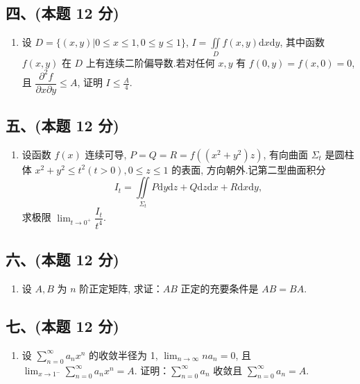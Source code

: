 \subsection*{四、(本题 12 分)}
\begin{enumerate}[start=7]
    \item 设 $D = \{(x,y) | 0 \leqslant x \leqslant 1, 0 \leqslant y \leqslant 1\}$, $I = \displaystyle\iint\limits_D f(x,y) \mathrm{d}x \mathrm{d}y$, 其中函数 $f(x,y)$ 在 $D$ 上有连续二阶偏导数.若对任何 $x, y$ 有 $f(0,y) = f(x,0) = 0$, 且 $\dfrac{\partial^2 f}{\partial x \partial y} \leqslant A$, 证明 $I \leqslant \frac{A}{4}$.
\end{enumerate}

\subsection*{五、(本题 12 分)}
\begin{enumerate}[start=8]
    \item 设函数 $f(x)$ 连续可导, $P=Q=R=f((x^2+y^2)z)$, 有向曲面 $\Sigma_t$ 是圆柱体 $x^2+y^2\leqslant t^2 (t>0), 0\leqslant z\leqslant 1$ 的表面, 方向朝外.记第二型曲面积分
          \[
              I_t = \iint\limits_{\Sigma_t} P \mathrm{d}y \mathrm{d}z + Q \mathrm{d}z \mathrm{d}x + R \mathrm{d}x \mathrm{d}y,
          \]
          求极限 $\displaystyle\lim_{t\rightarrow 0^+} \dfrac{I_t}{t^4}$.
\end{enumerate}

\subsection*{六、(本题 12 分)}
\begin{enumerate}[start=9]
    \item 设 $A, B$ 为 $n$ 阶正定矩阵, 求证：$AB$ 正定的充要条件是 $AB=BA$.
\end{enumerate}

\subsection*{七、(本题 12 分)}
\begin{enumerate}[start=10]
    \item 设 $\displaystyle\sum_{n=0}^{\infty} a_n x^n$ 的收敛半径为 1, $\displaystyle\lim_{n\rightarrow\infty} n a_n = 0$, 且 $\displaystyle\lim_{x\rightarrow 1^-} \displaystyle\sum_{n=0}^{\infty} a_n x^n = A$. 证明：$\displaystyle\sum_{n=0}^{\infty} a_n$ 收敛且 $\displaystyle\sum_{n=0}^{\infty} a_n = A$.
\end{enumerate}


